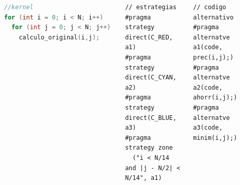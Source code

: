 \documentclass{beamer}\usetheme{Madrid} %
\begin{document}
\begin{frame}[fragile]
\begin{columns}
\begin{center}
\end{center}
\begin{block}{}
\begin{lstlisting}[basicstyle=\scriptsize, language=C]
//kernel
for (int i = 0; i < N; i++)
  for (int j = 0; j < N; j++) 
    calculo_original(i,j);
\end{lstlisting}
\end{block}
\begin{block}{}
\begin{lstlisting}[basicstyle=\scriptsize]
// estrategias
#pragma strategy direct(C_RED, a1)
#pragma strategy direct(C_CYAN, a2)
#pragma strategy direct(C_BLUE, a3)
#pragma strategy zone
  ("i < N/14 and |j - N/2| < N/14", a1)
\end{lstlisting}
\end{block}
\begin{block}{}
\begin{lstlisting}[basicstyle=\scriptsize]
// codigo alternativo
#pragma alternatve a1(code, prec(i,j);)
#pragma alternatve a2(code, ahorr(i,j);)
#pragma alternatve a3(code, minim(i,j);)
\end{lstlisting}
\end{block}
\end{columns}
\end{frame}







\begin{frame}
\frametitle{}

\end{frame}


\end{document}
